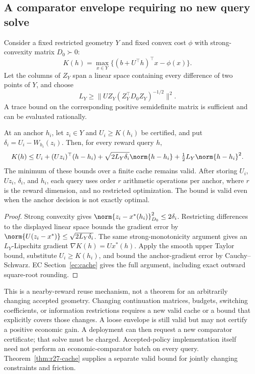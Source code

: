 \subsection{A comparator envelope requiring no new query solve}
Consider a fixed restricted geometry $Y$ and fixed convex cost $\phi$ with strong-convexity matrix $D_0\succ0$:
\[
 K(h)=\max_{x\in Y}\{(b+U^\top h)^\top x-\phi(x)\}.
\]
Let the columns of $Z_Y$ span a linear space containing every difference of two points of $Y$, and choose
\[
 L_Y\geq\bigl\|UZ_Y(Z_Y^\top D_0Z_Y)^{-1/2}\bigr\|^2.
\]
A trace bound on the corresponding positive semidefinite matrix is sufficient and can be evaluated rationally.
\begin{proposition}\label{prop:cache}
At an anchor $h_i$, let $z_i\in Y$ and $U_i\geq K(h_i)$ be certified, and put $\delta_i=U_i-W_{h_i}(z_i)$. Then, for every reward query $h$,
\begin{equation}\label{eq:cache}
 K(h)\leq U_i+(Uz_i)^\top(h-h_i)
 +\sqrt{2L_Y\delta_i}\norm{h-h_i}
 +\tfrac12L_Y\norm{h-h_i}^2.
\end{equation}
The minimum of these bounds over a finite cache remains valid. After storing $U_i$, $Uz_i$, $\delta_i$, and $h_i$, each query uses order $r$ arithmetic operations per anchor, where $r$ is the reward dimension, and no restricted optimization. The bound is valid even when the anchor decision is not exactly optimal.
\end{proposition}
\begin{proof}
Strong convexity gives $\norm{z_i-x^*(h_i)}_{D_0}^2\leq2\delta_i$. Restricting differences to the displayed linear space bounds the gradient error by $\norm{U(z_i-x^*)}\leq\sqrt{2L_Y\delta_i}$. The same strong-monotonicity argument gives an $L_Y$-Lipschitz gradient $\nabla K(h)=Ux^*(h)$. Apply the smooth upper Taylor bound, substitute $U_i\geq K(h_i)$, and bound the anchor-gradient error by Cauchy--Schwarz. EC Section~\ref{ec:cache} gives the full argument, including exact outward square-root rounding.\end{proof}

This is a nearby-reward reuse mechanism, not a theorem for an arbitrarily changing accepted geometry. Changing continuation matrices, budgets, switching coefficients, or information restrictions requires a new valid cache or a bound that explicitly covers those changes. A loose envelope is still valid but may not certify a positive economic gain. A deployment can then request a new comparator certificate; that solve must be charged. Accepted-policy implementation itself need not perform an economic-comparator batch on every query. Theorem~\ref{thm:r27-cache} supplies a separate valid bound for jointly changing constraints and friction.

